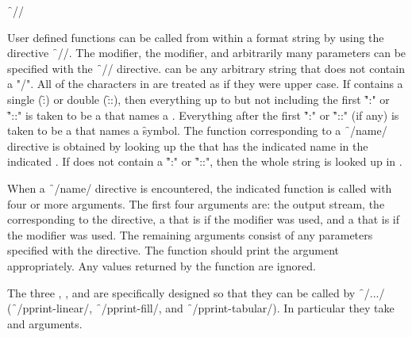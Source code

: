 \f{~//}

User defined functions can be called from within a format
string by using the directive \f{~//}.
The  modifier, the  modifier, and arbitrarily many parameters 
can be specified with the \f{~//} directive.
 can be any arbitrary string that does not contain a "/".
All of the characters in  are treated as if they were upper case.
If  contains a single  (\f{:}) or double  (\f{::}),
then everything up to but not including the first \f{":"} or \f{"::"}
is taken to be a  that names a .
Everything after the first \f{":"} or \f{"::"} (if any) is taken to be a 
 that names a \f{symbol}.  The function corresponding to a 
\f{~/name/} directive is obtained by looking up the 
that has the indicated name in the indicated .
If  does not contain a \f{":"} or \f{"::"},
then the whole  string is looked up in . 

When a \f{~/name/} directive is encountered,
the indicated function is called with four or more arguments.
The first four arguments are:
     the output stream,
     the  corresponding to the directive,
     a  that is  if the  modifier was used,
 and a  that is  if the  modifier was used.
The remaining arguments consist of any parameters specified with the directive.
The function should print the argument appropriately.
Any values returned by the function are ignored.
 
The three  
      ,
      ,
  and 
are specifically designed so that they can be called by \f{~/.../}
(\ie \f{~/pprint-linear/}, \f{~/pprint-fill/}, and \f{~/pprint-tabular/}).
In particular they take  and  arguments.

\endsubsubsection%


\endsubsection%



